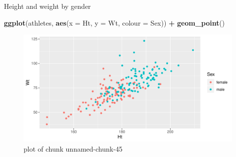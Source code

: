 \documentclass[
  ignorenonframetext,
]{beamer}
\newenvironment{Shaded}{\begin{snugshade}}{\end{snugshade}}
\newcommand{\DataTypeTok}[1]{\textcolor[rgb]{0.13,0.29,0.53}{#1}}
\newcommand{\KeywordTok}[1]{\textcolor[rgb]{0.13,0.29,0.53}{\textbf{#1}}}
\newcommand{\NormalTok}[1]{#1}
\newcommand{\OperatorTok}[1]{\textcolor[rgb]{0.81,0.36,0.00}{\textbf{#1}}}
\newcommand{\StringTok}[1]{\textcolor[rgb]{0.31,0.60,0.02}{#1}}
\begin{document}
\begin{frame}[fragile]{Height and weight by gender}
\protect\hypertarget{height-and-weight-by-gender}{}

\begin{Shaded}
\begin{Highlighting}[]
\KeywordTok{ggplot}\NormalTok{(athletes, }\KeywordTok{aes}\NormalTok{(}\DataTypeTok{x =}\NormalTok{ Ht, }\DataTypeTok{y =}\NormalTok{ Wt, }\DataTypeTok{colour =}\NormalTok{ Sex)) }\OperatorTok{+}
\StringTok{  }\KeywordTok{geom_point}\NormalTok{()}
\end{Highlighting}
\end{Shaded}

\begin{figure}
\centering
\includegraphics{figure/unnamed-chunk-45-1.pdf}
\caption{plot of chunk unnamed-chunk-45}
\end{figure}

\end{frame}
\end{document}
